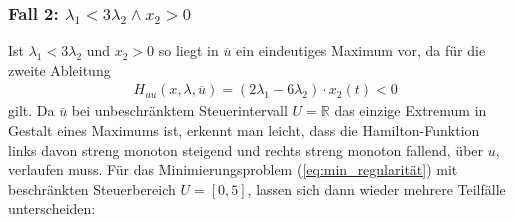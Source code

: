 \subsubsection*{Fall 2: \boldmath$\lambda_1 < 3\lambda_2 \land x_2 > 0$}
Ist $\lambda_1 < 3\lambda_2$ und $x_2 > 0$ so liegt in $\overline{u}$ ein eindeutiges Maximum vor, da für die zweite Ableitung 
\begin{align}
	&H_{uu}(x,\lambda,\overline{u})  = (2 \lambda_1 -  6 \lambda_2) \cdot  x_2(t) < 0
\end{align} gilt. 
Da $\overline{u}$ bei unbeschränktem Steuerintervall $U=\mathbb{R}$ das einzige Extremum in Gestalt eines Maximums ist, erkennt man leicht, dass die Hamilton-Funktion links davon streng monoton steigend und rechts streng monoton fallend, über $u$, verlaufen muss. 
Für das Minimierungsproblem (\ref{eq:min_regularität}) mit beschränkten Steuerbereich $U=[0,5]$, lassen sich dann wieder mehrere Teilfälle unterscheiden:

